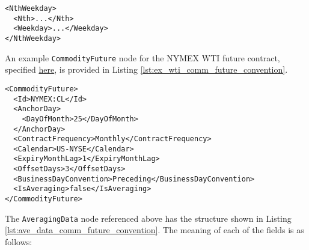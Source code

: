 \begin{listing}[h!]
\begin{verbatim}
<NthWeekday>
  <Nth>...</Nth>
  <Weekday>...</Weekday>
</NthWeekday>
\end{verbatim}
\caption{\textnormal{\lstinline!NthWeekday!} node outline}
\label{lst:nth_weekday_node}
\end{listing}

An example \lstinline!CommodityFuture! node for the NYMEX WTI future contract, specified \href{https://www.cmegroup.com/trading/energy/crude-oil/light-sweet-crude_contract_specifications.html}{here}, is provided in Listing \ref{lst:ex_wti_comm_future_convention}.

\begin{listing}[h!]
\begin{verbatim}
<CommodityFuture>
  <Id>NYMEX:CL</Id>
  <AnchorDay>
    <DayOfMonth>25</DayOfMonth>
  </AnchorDay>
  <ContractFrequency>Monthly</ContractFrequency>
  <Calendar>US-NYSE</Calendar>
  <ExpiryMonthLag>1</ExpiryMonthLag>
  <OffsetDays>3</OffsetDays>
  <BusinessDayConvention>Preceding</BusinessDayConvention>
  <IsAveraging>false</IsAveraging>
</CommodityFuture>
\end{verbatim}
\caption{NYMEX WTI \textnormal{\lstinline!CommodityFuture!} node}
\label{lst:ex_wti_comm_future_convention}
\end{listing}

The \lstinline!AveragingData! node referenced above has the structure shown in Listing \ref{lst:ave_data_comm_future_convention}. The meaning of each of the fields is as follows:

